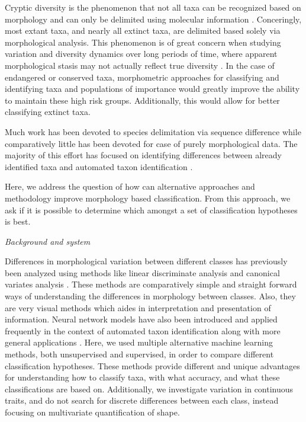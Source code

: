 \documentclass[12pt,letterpaper]{article}\usepackage{graphicx, color}
\renewcommand{\section}[1]{%
\bigskip
\begin{center}
\begin{Large}
\normalfont\scshape #1
\medskip
\end{Large}
\end{center}}
\renewcommand{\subsection}[1]{%
\bigskip
\begin{center}
\begin{large}
\normalfont\itshape #1
\end{large}
\end{center}}
\begin{document}

Cryptic diversity is the phenomenon that not all taxa can be recognized based on morphology and can only be delimited using molecular information \citep{Stuart2006,Pfenninger2007,Funk2012,Clare2011}. Conceringly, most extant taxa, and nearly all extinct taxa, are delimited based solely via morphological analysis. This phenomenon is of great concern when studying variation and diversity dynamics over long periods of time, where apparent morphological stasis may not actually reflect true diversity \citet{Hunt2008,Eldredge1972,Gould1977a}. In the case of endangered or conserved taxa, morphometric approaches for classifying and identifying taxa and populations of importance would greatly improve the ability to maintain these high risk groups. Additionally, this would allow for better classifying extinct taxa.

Much work has been devoted to species delimitation via sequence difference \citep{Fujita2012,Yang2010b} while comparatively little has been devoted for case of purely morphological data. The majority of this effort has focused on identifying differences between already identified taxa \citep{Zelditch2004} and automated taxon identification \citep{MacLeod2007}.

Here, we address the question of how can alternative approaches and methodology improve morphology based classification. From this approach, we ask if it is possible to determine which amongst a set of classification hypotheses is best.

\subsection{Background and system}
Differences in morphological variation between different classes has previously been analyzed using methods like linear discriminate analysis and canonical variates analysis \citep{Zelditch2004}. These methods are comparatively simple and straight forward ways of understanding the differences in morphology between classes. Also, they are very visual methods which aides in interpretation and presentation of information. Neural network models have also been introduced and applied frequently in the context of automated taxon identification along with more general applications \citep{MacLeod2007}. Here, we used multiple alternative machine learning methods, both unsupervised and supervised, in order to compare different classification hypotheses. These methods provide different and unique advantages for understanding how to classify taxa, with what accuracy, and what these classifications are based on. Additionally, we investigate variation in continuous traits, and do not search for discrete differences between each class, instead focusing on multivariate quantification of shape.
\end{document}
